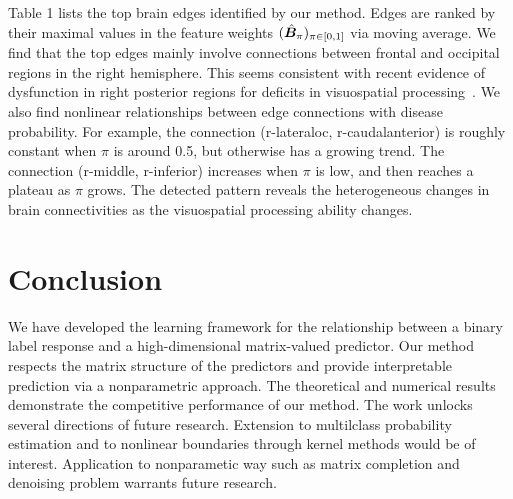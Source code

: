 \documentclass[11pt]{article}
\theoremstyle{definition}
\def\NonparaM{\text{\bf \small NonMAR }}
\begin{document}
Table 1 lists the top brain edges identified by our method. Edges are ranked by their maximal values in the feature weights $(\hat {\bm B}_\pi)_{\pi \in [0,1]}$ via moving average. We find that the top edges mainly involve connections between frontal and occipital regions in the right hemisphere. This seems consistent with recent evidence of dysfunction in right posterior regions for deficits in visuospatial processing~\citep{wang2017common}. We also find nonlinear relationships between edge connections with disease probability. For example, the connection (r-lateraloc, r-caudalanterior) is roughly constant when $\pi$ is around 0.5, but otherwise has a growing trend. The connection (r-middle, r-inferior) increases when $\pi$ is low, and then reaches a plateau as $\pi$ grows. The detected pattern reveals the heterogeneous changes in brain connectivities as the visuospatial processing ability changes. 




\section{Conclusion}
We have developed the learning framework for the relationship between a binary label response and a high-dimensional matrix-valued predictor. 
Our method respects the matrix structure of the predictors and provide interpretable prediction via a nonparametric approach. 
The theoretical and numerical results demonstrate the competitive performance of our method.
The work unlocks several directions of future research. Extension to multilclass probability estimation and to nonlinear boundaries through kernel methods would be of interest. Application to nonparametic way such as matrix completion and denoising problem warrants future research.



\end{document}
